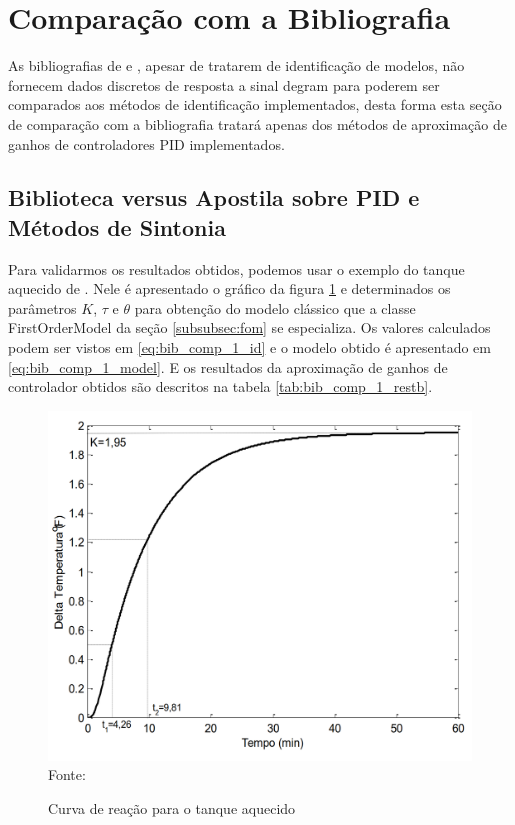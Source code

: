 \section{Comparação com a Bibliografia}

As bibliografias de \cite{ogata2010engenharia} e \cite{CoelhoIdentificacao}, apesar de tratarem de identificação de
modelos, não fornecem dados discretos de resposta a sinal degram para poderem ser comparados aos métodos de
identificação implementados, desta forma esta seção de comparação com a bibliografia tratará apenas dos métodos de
aproximação de ganhos de controladores PID implementados.

\subsection{Biblioteca versus Apostila sobre PID e Métodos de Sintonia}

Para validarmos os resultados obtidos, podemos usar o exemplo do tanque aquecido de \cite{apostpidsint}.
Nele é apresentado o gráfico da figura \ref{fig:bib_comp_1_graph} e determinados os parâmetros $K$, $\tau$ e $\theta$ para
obtenção do modelo clássico que a classe FirstOrderModel da seção \ref{subsubsec:fom} se especializa.
Os valores calculados podem ser vistos em \ref{eq:bib_comp_1_id} e o modelo obtido é apresentado em
\ref{eq:bib_comp_1_model}.
E os resultados da aproximação de ganhos de controlador obtidos são descritos na tabela \ref{tab:bib_comp_1_restb}.


\begin{figure}[H]
    \centering
    \caption{Curva de reação para o tanque aquecido}
    \includegraphics[scale=0.4]{figuras/bib_comp_1_graph}
    \label{fig:bib_comp_1_graph}
    \\
    \vspace{0cm}\hspace{0cm}\small{Fonte: \cite{apostpidsint}}
\end{figure}

